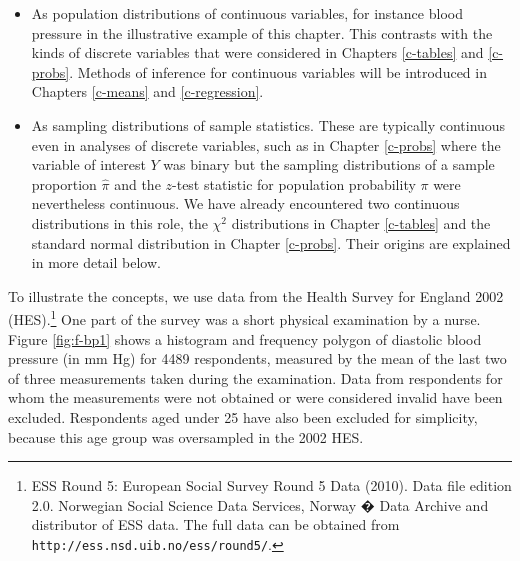 \documentclass[11pt,a4paper,openany]{book}
\let\rmarkdownfootnote\footnote%
\def\footnote{\protect\rmarkdownfootnote}
\begin{document}
\begin{itemize}
\item
  As population distributions of continuous variables, for instance
  blood pressure in the illustrative example of this chapter. This
  contrasts with the kinds of discrete variables that were considered in
  Chapters \ref{c-tables} and \ref{c-probs}. Methods of inference for
  continuous variables will be introduced in Chapters \ref{c-means} and
  \ref{c-regression}.
\item
  As sampling distributions of sample statistics. These are typically
  continuous even in analyses of discrete variables, such as in Chapter
  \ref{c-probs} where the variable of interest \(Y\) was binary but the
  sampling distributions of a sample proportion \(\hat{\pi}\) and the
  \(z\)-test statistic for population probability \(\pi\) were
  nevertheless continuous. We have already encountered two continuous
  distributions in this role, the \(\chi^{2}\) distributions in Chapter
  \ref{c-tables} and the standard normal distribution in Chapter
  \ref{c-probs}. Their origins are explained in more detail below.
\end{itemize}

To illustrate the concepts, we use data from the Health Survey for
England 2002 (HES).\footnote{ESS Round 5: European Social Survey Round 5
  Data (2010). Data file edition 2.0. Norwegian Social Science Data
  Services, Norway � Data Archive and distributor of ESS data. The full
  data can be obtained from \texttt{http://ess.nsd.uib.no/ess/round5/}.}
One part of the survey was a short physical examination by a nurse.
Figure \ref{fig:f-bp1} shows a histogram and frequency polygon of
diastolic blood pressure (in mm Hg) for 4489 respondents, measured by
the mean of the last two of three measurements taken during the
examination. Data from respondents for whom the measurements were not
obtained or were considered invalid have been excluded. Respondents aged
under 25 have also been excluded for simplicity, because this age group
was oversampled in the 2002 HES.
\end{document}
